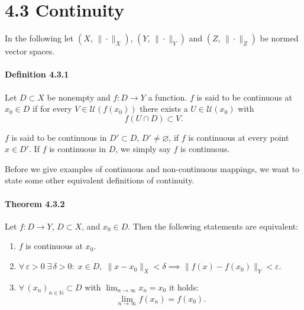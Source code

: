\documentclass[12pt]{article}
\begin{document}
\section*{4.3 Continuity}

In the following let $(X,\,\|\cdot\|_X)$, $(Y,\,\|\cdot\|_Y)$ and $(Z,\,\|\cdot\|_Z)$ be normed vector spaces.

\paragraph{Definition 4.3.1} Let $D \subset X$ be nonempty and $f : D \to Y$ a function. $f$ is said to be continuous at $x_0 \in D$ if for every $V \in \mathcal U(f(x_0))$ there exists a $U \in \mathcal U(x_0)$ with
\[
 f(U \cap D) \subset V.
\]

$f$ is said to be continuous in $D' \subset D$, $D' \neq \varnothing$, if $f$ is continuous at every point $x \in D'$. If $f$ is continuous in $D$, we simply say $f$ is continuous.

Before we give examples of continuous and non-continuous mappings, we want to state some other equivalent definitions of continuity.

\paragraph{Theorem 4.3.2} Let $f : D \to Y$, $D \subset X$, and $x_0 \in D$. Then the following statements are equivalent:
\begin{enumerate}[label=({\arabic*})]
	\item $f$ is continuous at $x_0$.
	\item $\forall\, \varepsilon > 0\; \exists\, \delta > 0:\; x \in D,\; \|x - x_0\|_X < \delta \implies \|f(x) - f(x_0)\|_Y < \varepsilon.$
	\item $\forall\,(x_n)_{n\in\mathbb N} \subset D$ with $\lim_{n\to\infty} x_n = x_0$ it holds:
	\[
		\lim_{n\to\infty} f(x_n) = f(x_0).
	\]
\end{enumerate}
\end{document}
